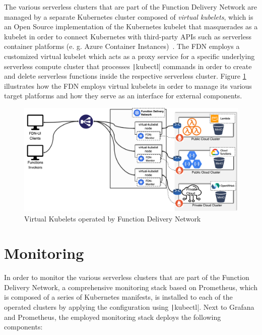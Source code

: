 The various serverless clusters that are part of the Function Delivery Network are managed by a separate Kubernetes cluster composed of \textit{virtual kubelets}, which is an Open Source implementation of the Kubernetes kubelet that masquerades as a kubelet in order to connect Kubernetes with third-party APIs such as serverless container platforms (e. g. Azure Container Instances)~\parencite{virtual-kubelet}. The FDN employs a customized virtual kubelet which acts as a proxy service for a specific underlying serverless compute cluster that processes \texttt|kubectl| commands in order to create and delete serverless functions inside the respective serverless cluster. Figure \ref{fig:fdn-vkubelet-provider} illustrates how the FDN employs virtual kubelets in order to manage its various target platforms and how they serve as an interface for external components.

\begin{figure}[H]
    \centering
    \includegraphics[width=1\textwidth]{./figures/fdn-vkubelet-provider}
    \caption{Virtual Kubelets operated by Function Delivery Network}
    \label{fig:fdn-vkubelet-provider}
\end{figure}


\section{Monitoring}
In order to monitor the various serverless clusters that are part of the Function Delivery Network, a comprehensive monitoring stack based on Prometheus, which is composed of a series of Kubernetes manifests, is installed to each of the operated clusters by applying the configuration using  \texttt|kubectl|. Next to Grafana and Prometheus, the employed monitoring stack deploys the following components:

